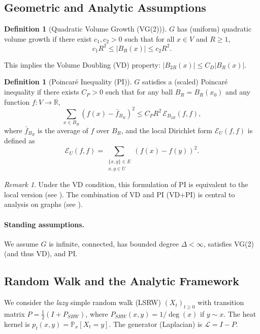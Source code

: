 \documentclass{article}
\numberwithin{equation}{section}
\theoremstyle{definition}
\newtheorem{definition}[theorem]{Definition}
\theoremstyle{remark}
\newtheorem{remark}[theorem]{Remark}
\newcommand{\cE}{\mathcal{E}}
\newcommand{\LL}{\mathcal{L}}
\newcommand{\R}{\mathbb{R}}
\newcommand{\Prob}{\mathbb{P}}
\begin{document}
\subsection{Geometric and Analytic Assumptions}

\begin{definition}[Quadratic Volume Growth (VG(2))]
$G$ has (uniform) quadratic volume growth if there exist $c_1, c_2 > 0$ such that for all $x \in V$ and $R \geq 1$,
\begin{equation}\label{eq:quad}
c_1 R^{2} \leq |B_R(x)| \leq c_2 R^{2}.
\end{equation}
\end{definition}
This implies the Volume Doubling (VD) property: $|B_{2R}(x)| \leq C_D |B_R(x)|$.

\begin{definition}[Poincaré Inequality (PI)]\label{def:PI}
$G$ satisfies a (scaled) Poincaré inequality if there exists $C_P > 0$ such that for any ball $B_R=B_R(x_0)$ and any function $f: V \to \R$,
\[
\sum_{x \in B_R} (f(x) - \bar{f}_{B_R})^2 \leq C_P R^2 \, \cE_{B_{2R}}(f,f),
\]
where $\bar{f}_{B_R}$ is the average of $f$ over $B_R$, and the local Dirichlet form $\cE_U(f,f)$ is defined as
\[
\cE_U(f,f) = \sum_{\substack{\{x,y\} \in E \\ x,y \in U}} (f(x)-f(y))^2.
\]
\end{definition}

\begin{remark}\label{rem:PI_equivalence}
Under the VD condition, this formulation of PI is equivalent to the local version (see \cite{HajlaszKoskela00}). The combination of VD and PI (VD+PI) is central to analysis on graphs (see \cite{GrigoryanTelcs12}).
\end{remark}

\paragraph{Standing assumptions.} We assume $G$ is infinite, connected, has bounded degree $\Delta < \infty$, satisfies VG(2) (and thus VD), and PI.

\subsection{Random Walk and the Analytic Framework}
We consider the \emph{lazy} simple random walk (LSRW) $(X_t)_{t \geq 0}$ with transition matrix $P = \frac{1}{2}(I + P_{SRW})$, where $P_{SRW}(x,y) = 1/\deg(x)$ if $y \sim x$. The heat kernel is $p_t(x,y) = \Prob_x[X_t = y]$. The generator (Laplacian) is $\LL = I - P$.
\end{document}
